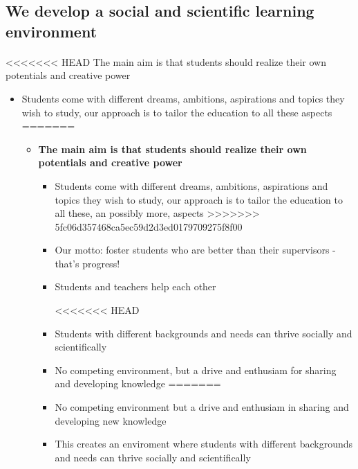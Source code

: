 \documentclass[%
<<<<<<< HEAD
oneside,                 %
final,                   %
=======
twoside,                 %
final,                   %
>>>>>>> 5fc06d357468ca5ec59d2d3ed0179709275f8f00
10pt]{article}
\begin{document}


\subsection*{We develop a social and scientific learning environment}


\paragraph{}
<<<<<<< HEAD
The main aim is that students should realize their own potentials and creative power

\begin{itemize}
 \item Students come with different dreams, ambitions, aspirations and topics they wish to study, our approach is to tailor the education to all these aspects
=======
\begin{itemize}
\item \textbf{The main aim is that students should realize their own potentials and creative power}
\begin{itemize}

 \item Students come with different dreams, ambitions, aspirations and topics they wish to study, our approach is to tailor the education to all these, an possibly more, aspects
>>>>>>> 5fc06d357468ca5ec59d2d3ed0179709275f8f00

 \item Our motto: foster students who are better than their supervisors - that's progress!

 \item Students and teachers help each other

<<<<<<< HEAD
 \item Students with different backgrounds and needs can thrive socially and scientifically

 \item No competing environment, but a drive and enthusiam for sharing and developing knowledge
=======
 \item No competing environment but a drive and enthusiam in sharing and developing new knowledge

 \item This creates an enviroment where students with different backgrounds and needs can thrive socially and scientifically

\end{itemize}


\end{itemize}
\end{itemize}
\end{document}

